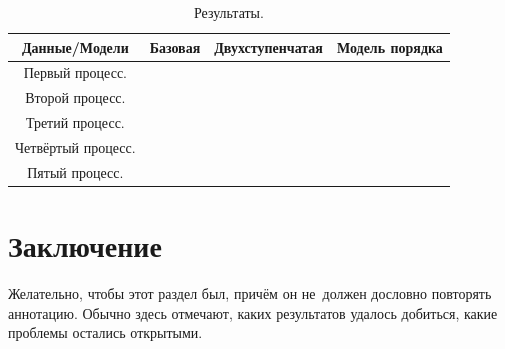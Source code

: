 \documentclass[12pt, twoside]{article}
\theoremstyle{definition}
\begin{document}
\begin{center}
\begin{table}
 \begin{tabular}{||c c c c||} 
 \hline
 Данные/Модели & Базовая & Двухступенчатая & Модель порядка \\ [0.5ex] 
 \hline\hline
 Первый процесс. &  &  &  \\ 
 \hline
 Второй процесс. &  &  &  \\
 \hline
 Третий процесс. &  &  &  \\
 \hline
 Четвёртый процесс. &  &  &  \\
 \hline
 Пятый процесс. & &  &  \\ [1ex] 
 \hline
\end{tabular}
\caption{\label{tab:results}Результаты.}
\end{table}
\end{center}

\section{Заключение}
Желательно, чтобы этот раздел был, причём он не~должен дословно повторять аннотацию.
Обычно здесь отмечают, каких результатов удалось добиться, какие проблемы остались открытыми.
\end{document}
